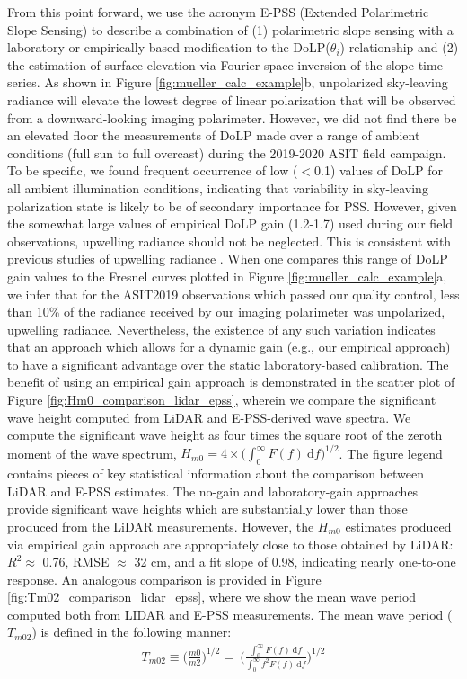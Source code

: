 \documentclass[letterpaper,journal]{IEEEtran}
\begin{document}
From this point forward, we use the acronym E-PSS (Extended Polarimetric Slope Sensing) to describe a combination of (1) polarimetric slope sensing with a laboratory or empirically-based modification to the DoLP($\theta_i$) relationship and (2) the estimation of surface elevation via Fourier space inversion of the slope time series. As shown in Figure \ref{fig:mueller_calc_example}b, unpolarized sky-leaving radiance will elevate the lowest degree of linear polarization that will be observed from a downward-looking imaging polarimeter. However, we did not find there be an elevated floor the measurements of DoLP made over a range of ambient conditions (full sun to full overcast) during the 2019-2020 ASIT field campaign. To be specific, we found frequent occurrence of low ($<$0.1) values of DoLP for all ambient illumination conditions, indicating that variability in sky-leaving polarization state is likely to be of secondary importance for PSS. However, given the somewhat large values of empirical DoLP gain (1.2-1.7) used during our field observations, upwelling radiance should not be neglected. This is consistent with previous studies of upwelling radiance \cite{You2011,ibrahim_relationship_2012}. When one compares this range of DoLP gain values to the Fresnel curves plotted in Figure \ref{fig:mueller_calc_example}a, we infer that for the ASIT2019 observations which passed our quality control, less than 10\% of the radiance received by our imaging polarimeter was unpolarized, upwelling radiance. Nevertheless, the existence of any such variation indicates that an approach which allows for a dynamic gain (e.g., our empirical approach) to have a significant advantage over the static laboratory-based calibration. The benefit of using an empirical gain approach is demonstrated in the scatter plot of Figure \ref{fig:Hm0_comparison_lidar_epss}, wherein we compare the significant wave height computed from LiDAR and E-PSS-derived wave spectra. We compute the significant wave height as four times the square root of the zeroth moment of the wave spectrum, $H_{m0}=4\times\Big(\int_0^\infty F(f)~\mathrm{d}f\Big)^{1/2}$. The figure legend contains pieces of key statistical information about the comparison between LiDAR and E-PSS estimates. The no-gain and laboratory-gain approaches provide significant wave heights which are substantially lower than those produced from the LiDAR measurements. However, the $H_{m0}$ estimates produced via empirical gain approach are appropriately close to those obtained by LiDAR: $R^2\approx$ 0.76, RMSE $\approx$ 32 cm, and a fit slope of 0.98, indicating nearly one-to-one response.
An analogous comparison is provided in Figure \ref{fig:Tm02_comparison_lidar_epss}, where we show the mean wave period computed both from LIDAR and E-PSS measurements. The mean wave period ($T_{m02}$) is defined in the following manner:
\begin{align}
    T_{m02}\equiv\Big(\frac{m0}{m2}\Big)^{1/2}=~ \Bigg(\frac{\int_0^\infty F(f)~\mathrm{d}f}{\int_0^\infty f^2F(f)~\mathrm{d}f}\Bigg)^{1/2}
\end{align}
\end{document}

